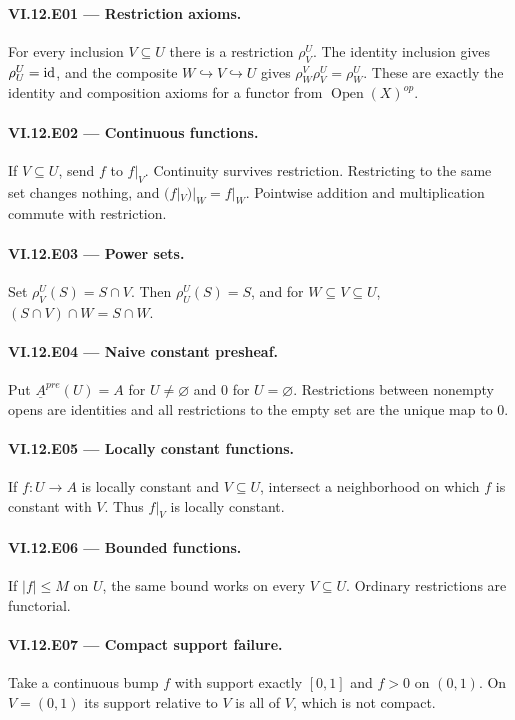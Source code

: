 \paragraph{VI.12.E01 --- Restriction axioms.}
For every inclusion $V\subseteq U$ there is a restriction $\rho^U_V$.  The identity inclusion gives $\rho^U_U=\operatorname{id}$, and the composite $W\hookrightarrow V\hookrightarrow U$ gives $\rho^V_W\rho^U_V=\rho^U_W$.  These are exactly the identity and composition axioms for a functor from $\operatorname{Open}(X)^{op}$.

\paragraph{VI.12.E02 --- Continuous functions.}
If $V\subseteq U$, send $f$ to $f|_V$.  Continuity survives restriction.  Restricting to the same set changes nothing, and $(f|_V)|_W=f|_W$.  Pointwise addition and multiplication commute with restriction.

\paragraph{VI.12.E03 --- Power sets.}
Set $\rho^U_V(S)=S\cap V$.  Then $\rho^U_U(S)=S$, and for $W\subseteq V\subseteq U$, $(S\cap V)\cap W=S\cap W$.

\paragraph{VI.12.E04 --- Naive constant presheaf.}
Put $\underline A^{pre}(U)=A$ for $U\ne\varnothing$ and $0$ for $U=\varnothing$.  Restrictions between nonempty opens are identities and all restrictions to the empty set are the unique map to $0$.

\paragraph{VI.12.E05 --- Locally constant functions.}
If $f:U\to A$ is locally constant and $V\subseteq U$, intersect a neighborhood on which $f$ is constant with $V$.  Thus $f|_V$ is locally constant.

\paragraph{VI.12.E06 --- Bounded functions.}
If $|f|\le M$ on $U$, the same bound works on every $V\subseteq U$.  Ordinary restrictions are functorial.

\paragraph{VI.12.E07 --- Compact support failure.}
Take a continuous bump $f$ with support exactly $[0,1]$ and $f>0$ on $(0,1)$.  On $V=(0,1)$ its support relative to $V$ is all of $V$, which is not compact.

